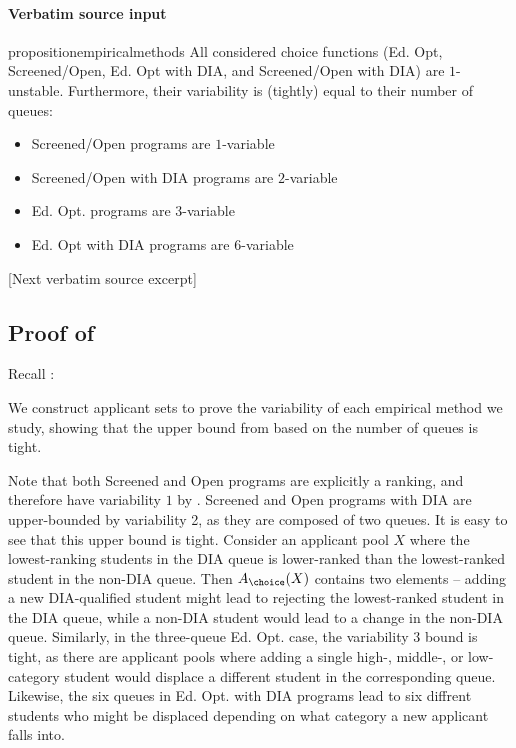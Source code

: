 \documentclass[10pt]{article}
\begin{document}
\paragraph{Verbatim source input}
\begin{ReviewVerbatim}
\begin{restatable}[]{proposition}{empiricalmethods}
\label{prop:program-variability}
All considered choice functions ({Ed. Opt}, {Screened/Open}, {Ed. Opt with DIA}, and {Screened/Open with DIA}) are $1$-unstable. Furthermore, their variability is (tightly) equal to their number of queues:

\begin{itemize}[noitemsep,topsep=0pt,parsep=0pt,partopsep=0pt]
    \item Screened/Open programs are $1$-variable
    \item Screened/Open with DIA programs are $2$-variable
    \item Ed. Opt. programs are $3$-variable
    \item Ed. Opt with DIA programs are $6$-variable
\end{itemize}

\end{restatable}

[Next verbatim source excerpt]

\subsection{Proof of } \label{sec:program-prop-proof}

Recall :
\empiricalmethods*

We construct applicant sets to prove the variability of each empirical method we study, showing that the upper bound from  based on the number of queues is tight.

Note that both Screened and Open programs are explicitly a ranking, and therefore have variability $1$ by  .
Screened and Open programs with DIA are upper-bounded by variability 2, as they are composed of two queues. It is easy to see that this upper bound is tight. Consider an applicant pool $X$ where the lowest-ranking students in the DIA queue is lower-ranked than the lowest-ranked student in the non-DIA queue. Then $A_\choice(X)$ contains two elements -- adding a new DIA-qualified student might lead to rejecting the lowest-ranked student in the DIA queue, while a non-DIA student would lead to a change in the non-DIA queue. Similarly, in the three-queue Ed. Opt. case, the variability $3$ bound is tight, as there are applicant pools where adding a single high-, middle-, or low-category student would displace a different student in the corresponding queue. Likewise, the six queues in Ed. Opt. with DIA programs lead to six diffrent students who might be displaced depending on what category a new applicant falls into.
\end{ReviewVerbatim}
\end{document}
